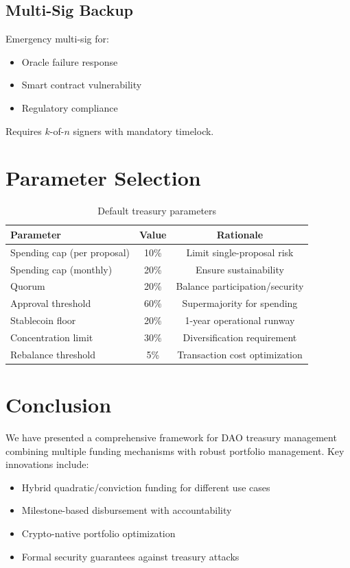 \documentclass[11pt,a4paper]{article}
\theoremstyle{definition}
\theoremstyle{remark}
\begin{document}
\subsection{Multi-Sig Backup}

Emergency multi-sig for:
\begin{itemize}
    \item Oracle failure response
    \item Smart contract vulnerability
    \item Regulatory compliance
\end{itemize}

Requires $k$-of-$n$ signers with mandatory timelock.

\section{Parameter Selection}

\begin{table}[h]
\centering
\begin{tabular}{lcc}
\toprule
Parameter & Value & Rationale \\
\midrule
Spending cap (per proposal) & 10\% & Limit single-proposal risk \\
Spending cap (monthly) & 20\% & Ensure sustainability \\
Quorum & 20\% & Balance participation/security \\
Approval threshold & 60\% & Supermajority for spending \\
Stablecoin floor & 20\% & 1-year operational runway \\
Concentration limit & 30\% & Diversification requirement \\
Rebalance threshold & 5\% & Transaction cost optimization \\
\bottomrule
\end{tabular}
\caption{Default treasury parameters}
\end{table}

\section{Conclusion}

We have presented a comprehensive framework for DAO treasury management combining multiple funding mechanisms with robust portfolio management. Key innovations include:

\begin{itemize}
    \item Hybrid quadratic/conviction funding for different use cases
    \item Milestone-based disbursement with accountability
    \item Crypto-native portfolio optimization
    \item Formal security guarantees against treasury attacks
\end{itemize}
\end{document}
